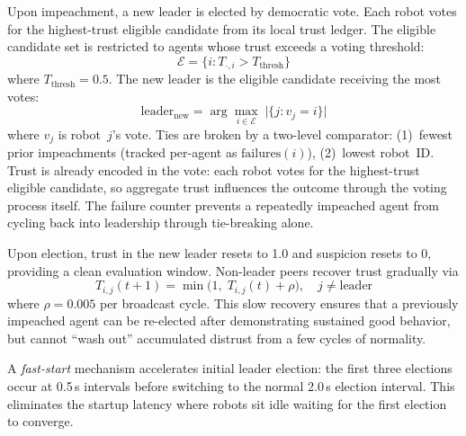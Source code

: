 \documentclass[conference]{IEEEtran}
\begin{document}
Upon impeachment, a new leader is elected by democratic vote. Each robot votes for the highest-trust eligible candidate from its local trust ledger. The eligible candidate set is restricted to agents whose trust exceeds a voting threshold:
\begin{equation}
    \mathcal{E} = \bigl\{i : T_{\cdot,i} > T_{\text{thresh}}\bigr\}
    \label{eq:eligible_set}
\end{equation}
where $T_{\text{thresh}} = 0.5$. The new leader is the eligible candidate receiving the most votes:
\begin{equation}
    \text{leader}_{\text{new}} = \arg\max_{i \in \mathcal{E}} \;
    \bigl|\{j : v_j = i\}\bigr|
    \label{eq:election}
\end{equation}
where $v_j$ is robot~$j$'s vote. Ties are broken by a two-level comparator: (1)~fewest prior impeachments (tracked per-agent as $\text{failures}(i)$), (2)~lowest robot~ID. Trust is already encoded in the vote: each robot votes for the highest-trust eligible candidate, so aggregate trust influences the outcome through the voting process itself. The failure counter prevents a repeatedly impeached agent from cycling back into leadership through tie-breaking alone.

Upon election, trust in the new leader resets to 1.0 and suspicion resets to 0, providing a clean evaluation window. Non-leader peers recover trust gradually via
\begin{equation}
    T_{i,j}(t{+}1) = \min\bigl(1,\; T_{i,j}(t) + \rho\bigr),
    \quad j \neq \text{leader}
    \label{eq:trust_recovery}
\end{equation}
where $\rho = 0.005$ per broadcast cycle. This slow recovery ensures that a previously impeached agent can be re-elected after demonstrating sustained good behavior, but cannot ``wash out'' accumulated distrust from a few cycles of normality.

A \emph{fast-start} mechanism accelerates initial leader election: the first three elections occur at 0.5\,s intervals before switching to the normal 2.0\,s election interval. This eliminates the startup latency where robots sit idle waiting for the first election to converge.
\end{document}
